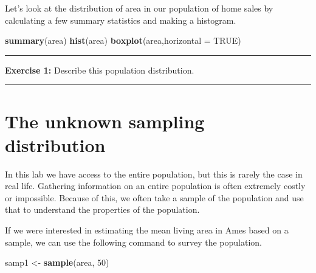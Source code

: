 \documentclass[]{book}
\newenvironment{Shaded}{\begin{snugshade}}{\end{snugshade}}
\newcommand{\KeywordTok}[1]{\textcolor[rgb]{0.13,0.29,0.53}{\textbf{#1}}}
\newcommand{\DataTypeTok}[1]{\textcolor[rgb]{0.13,0.29,0.53}{#1}}
\newcommand{\DecValTok}[1]{\textcolor[rgb]{0.00,0.00,0.81}{#1}}
\newcommand{\StringTok}[1]{\textcolor[rgb]{0.31,0.60,0.02}{#1}}
\newcommand{\OtherTok}[1]{\textcolor[rgb]{0.56,0.35,0.01}{#1}}
\newcommand{\OperatorTok}[1]{\textcolor[rgb]{0.81,0.36,0.00}{\textbf{#1}}}
\newcommand{\NormalTok}[1]{#1}
\theoremstyle{definition}
\theoremstyle{definition}
\theoremstyle{definition}
\theoremstyle{remark}
\begin{document}
\begin{Shaded}
\end{Shaded}

Let's look at the distribution of area in our population of home sales
by calculating a few summary statistics and making a histogram.

\begin{Shaded}
\begin{Highlighting}[]
\KeywordTok{summary}\NormalTok{(area)}
\KeywordTok{hist}\NormalTok{(area)}
\KeywordTok{boxplot}\NormalTok{(area,}\DataTypeTok{horizontal =} \OtherTok{TRUE}\NormalTok{)}
\end{Highlighting}
\end{Shaded}

\begin{center}\rule{0.5\linewidth}{\linethickness}\end{center}

\textbf{Exercise 1:} Describe this population distribution.

\begin{center}\rule{0.5\linewidth}{\linethickness}\end{center}

\section{The unknown sampling
distribution}\label{the-unknown-sampling-distribution}

In this lab we have access to the entire population, but this is rarely
the case in real life. Gathering information on an entire population is
often extremely costly or impossible. Because of this, we often take a
sample of the population and use that to understand the properties of
the population.

If we were interested in estimating the mean living area in Ames based
on a sample, we can use the following command to survey the population.

\begin{Shaded}
\begin{Highlighting}[]
\NormalTok{samp1 <-}\StringTok{ }\KeywordTok{sample}\NormalTok{(area, }\DecValTok{50}\NormalTok{)}
\end{Highlighting}
\end{Shaded}
\end{document}
